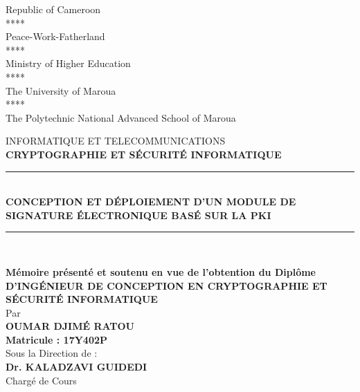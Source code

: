 \documentclass[12pt,a4paper]{report}
\newlength{\drop}
\begin{document}
\begin{minipage}[c]{.35\textwidth}
    \footnotesize
    \begin{center}
    Republic of Cameroon\\
	****\\
	Peace-Work-Fatherland\\
	****\\
	Ministry of Higher Education\\
	****\\
	The University of Maroua\\
	****\\
	The Polytechnic National Advanced School of Maroua\\
    \end{center}
\end{minipage}
\begin{center}
	\textheight %
	\vspace{0.5\drop}
	INFORMATIQUE ET TELECOMMUNICATIONS\\
	\textheight 
	\vspace{0.4\drop}
	\textbf{CRYPTOGRAPHIE ET SÉCURITÉ INFORMATIQUE}
	\rule{.95\textwidth}{2pt}\\
	\large{\textbf{CONCEPTION ET DÉPLOIEMENT D'UN MODULE DE SIGNATURE ÉLECTRONIQUE BASÉ SUR LA PKI}}\\
	\rule{.95\textwidth}{2pt}\\%

\end{center}


\begin{center}
	\textbf{Mémoire présenté et soutenu en vue de l’obtention du Diplôme}\\
	\vspace{0.2cm}
	\textbf{D’INGÉNIEUR DE CONCEPTION EN CRYPTOGRAPHIE ET SÉCURITÉ INFORMATIQUE}\\
	\vspace{0.2cm}
	Par \\
	\vspace{0.2cm}
	\textbf{OUMAR DJIMÉ RATOU}\\
	\vspace{0.2cm}
	\textbf{Matricule : 17Y402P}\\
	\vspace{0.3cm}
	Sous la Direction de : \\
	\vspace{0.2cm}
	\textbf{Dr. KALADZAVI GUIDEDI}\\
	\vspace{0.2cm}
	Chargé de Cours
	
	

\end{center}
\end{document}

